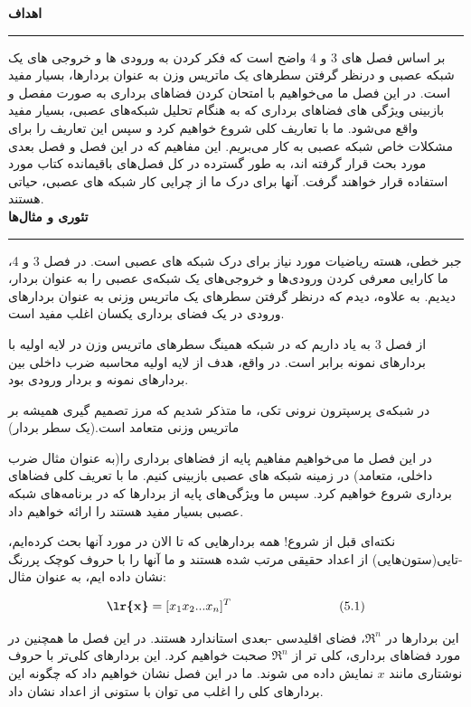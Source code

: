\documentclass[a4paper,12pt]{report}
\begin{document}
	\noindent\textbf{\Large{اهداف}}
	\hrule \vspace{0.3cm}	
			بر اساس فصل های 3 و 4 واضح است که فکر کردن به ورودی ها و خروجی های یک شبکه عصبی و درنظر گرفتن سطرهای یک ماتریس وزن به عنوان بردارها، بسیار مفید است. در این فصل ما می‌خواهیم با امتحان کردن فضاهای برداری به صورت مفصل و بازبینی ویژگی های فضاهای برداری که به هنگام تحلیل شبکه‌های عصبی، بسیار مفید واقع می‌شود. ما با تعاریف کلی شروع خواهیم کرد و سپس این تعاریف را برای مشکلات خاص شبکه عصبی به کار می‌بریم. این مفاهیم که در این فصل و فصل بعدی مورد بحث قرار گرفته اند، به طور گسترده در کل فصل‌های باقیمانده کتاب مورد استفاده قرار خواهند گرفت. آنها برای درک ما از چرایی کار شبکه های عصبی، حیاتی هستند.\\
			
	\noindent\textbf{\Large{تئوری و مثال‌ها}}
	\hrule \vspace{0.3cm}
	جبر خطی، هسته ریاضیات مورد نیاز برای درک شبکه های عصبی است. در فصل 3 و 4، ما کارایی معرفی کردن ورودی‌ها و خروجی‌های یک شبکه‌ی عصبی را به عنوان بردار، دیدیم. به علاوه، دیدم که درنظر گرفتن سطرهای یک ماتریس وزنی به عنوان بردارهای ورودی در یک فضای برداری یکسان اغلب مفید است.
	
	از فصل 3 به یاد داریم که در شبکه همینگ سطرهای ماتریس وزن در لایه اولیه با بردارهای نمونه برابر است. در واقع، هدف از لایه اولیه محاسبه ضرب داخلی بین بردارهای نمونه و بردار ورودی بود.
	
	در شبکه‌ی پرسپترون نرونی تکی، ما متذکر شدیم که مرز تصمیم گیری همیشه بر ماتریس وزنی متعامد است.(یک سطر بردار)
	
	در این فصل ما می‌خواهیم مفاهیم پایه از فضاهای برداری را(به عنوان مثال ضرب داخلی، متعامد) در زمینه شبکه های عصبی بازبینی کنیم. ما با تعریف کلی فضاهای برداری شروع خواهیم کرد. سپس ما ویژگی‌های پایه از بردارها که در برنامه‌های شبکه عصبی بسیار مفید هستند را ارائه خواهیم داد.
	
	نکته‌ای قبل از شروع! همه بردارهایی که تا الان در مورد آنها بحث کرده‌ایم، -تایی(ستون‌هایی) از اعداد حقیقی مرتب شده هستند و ما آنها را با حروف کوچک پررنگ نشان داده ایم، به عنوان مثال:
	
	 $$
	 \textbf{\lr{x}}=[x_1 x_2 ... x_n]^T \hspace{3cm} (5.1)
	 $$
	
	این بردارها در $ \Re^n $، فضای اقلیدسی -بعدی استاندارد هستند. در این فصل ما همچنین در مورد فضاهای برداری، کلی تر از $ \Re^n $ صحبت خواهیم کرد. این بردارهای کلی‌تر با حروف نوشتاری مانند $ x $ نمایش داده می شوند. ما در این فصل نشان خواهیم داد که چگونه این بردارهای کلی را اغلب می توان با ستونی از اعداد نشان داد.\\	
	
\end{document}
